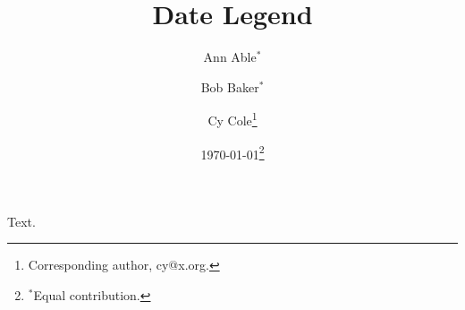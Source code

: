 \documentclass{article}
\title{Date Legend}
\author{Ann Able$^*$ \and Bob Baker$^*$ \and Cy Cole\thanks{Corresponding author, cy@x.org.}}
\date{\today\thanks{$^*$Equal contribution.}}
\begin{document}
\maketitle
Text.
\end{document}
